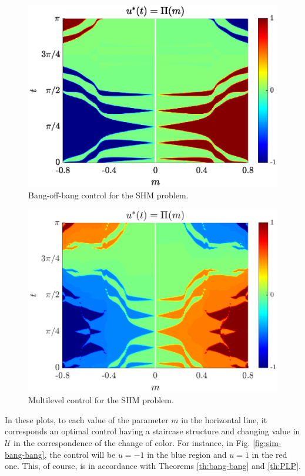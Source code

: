 \documentclass[twocolumn]{autart}    %
\begin{document}
\begin{figure}[ht!]
    \hspace{0.05em}
    \includegraphics[scale=0.525]{img/fig06.eps}
    \caption{Bang-off-bang control for the SHM problem.}\label{fig:sim-bang-off-bang}
\end{figure} 

\begin{figure}[ht!]
    \hspace{0.05em}
    \includegraphics[scale=0.525]{img/fig08.eps}
    \caption{Multilevel control for the SHM problem.}\label{fig:sim-multi-level}
\end{figure} 

In these plots, to each value of the parameter $m$ in the horizontal line, it corresponds an optimal control having a staircase structure and changing value in $\mathcal U$ in the correspondence of the change of color. For instance, in Fig. \ref{fig:sim-bang-bang}, the control will be $u=-1$ in the blue region and $u=1$ in the red one. This, of course, is in accordance with Theorems \ref{th:bang-bang} and \ref{th:PLP}.
\end{document}
